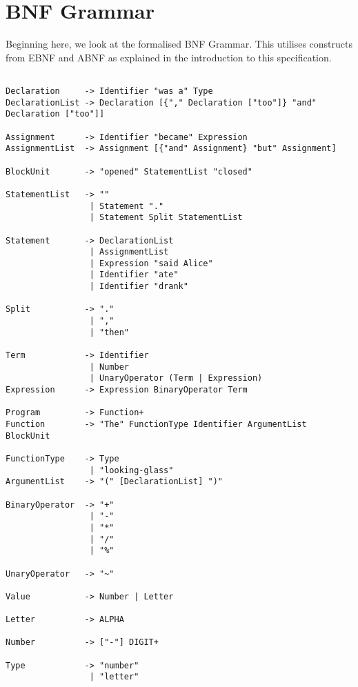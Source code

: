\documentclass[a4wide, 11pt]{article}
\begin{document}
\section{BNF Grammar} 

Beginning here, we look at the formalised BNF Grammar. This utilises constructs from EBNF and ABNF as explained in the introduction to this specification.

\begin{verbatim}

Declaration     -> Identifier "was a" Type
DeclarationList -> Declaration [{"," Declaration ["too"]} "and" Declaration ["too"]]

Assignment      -> Identifier "became" Expression
AssignmentList  -> Assignment [{"and" Assignment} "but" Assignment]

BlockUnit       -> "opened" StatementList "closed"

StatementList   -> ""
                 | Statement "."
                 | Statement Split StatementList
               
Statement       -> DeclarationList
                 | AssignmentList
                 | Expression "said Alice"
                 | Identifier "ate"
                 | Identifier "drank"

Split           -> "."
                 | ","
                 | "then"

Term            -> Identifier
                 | Number
                 | UnaryOperator (Term | Expression)
Expression      -> Expression BinaryOperator Term

Program         -> Function+
Function        -> "The" FunctionType Identifier ArgumentList BlockUnit

FunctionType    -> Type
                 | "looking-glass"
ArgumentList    -> "(" [DeclarationList] ")"

BinaryOperator  -> "+"
                 | "-"
                 | "*"
                 | "/" 
                 | "%"

UnaryOperator   -> "~" 

Value           -> Number | Letter

Letter          -> ALPHA

Number          -> ["-"] DIGIT+

Type            -> "number"
                 | "letter"

\end{verbatim}


\end{document}
